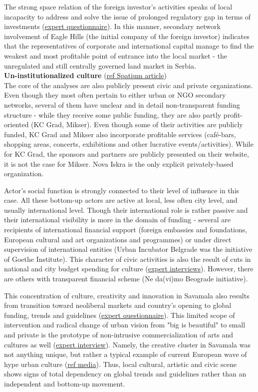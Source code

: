 \documentclass[11pt]{report}
\begin{document}
The strong space relation of the foreign investor's activities speaks of local incapacity to address and solve the issue of prolonged regulatory gap in terms of investments (\href{ref}{expert questionnaire}).
In this manner, secondary network involvement of Eagle Hills (the initial company of the foreign investor) indicates that the representatives of corporate and international capital manage to find the weakest and most profitable point of entrance into the local market - the unregulated and still centrally governed land market in Serbia.
\\

\textbf{Un-institutionalized culture} (\href{ref}{ref Spatium article})
\\
The core of the analyses are also publicly present civic and private organizations.
Even though they most often pertain to either urban or NGO secondary networks, several of them have unclear and in detail non-transparent funding structure - while they receive some public funding, they are also partly profit-oriented (KC Grad, Mikser).
Even though some of their activities are publicly funded, KC Grad and Mikser also incorporate profitable services (café-bars, shopping areas, concerts, exhibitions and other lucrative events/activities).
While for KC Grad, the sponsors and partners are publicly presented on their website, it is not the case for Mikser.
Nova Iskra is the only explicit privately-based organization.

Actor’s social function is strongly connected to their level of influence in this case.
All these bottom-up actors are active at local, less often city level, and usually international level. Though their international role is rather passive and their international visibility is more in the domain of funding - several are recipients of international financial support (foreign embassies and foundations, European cultural and art organizations and programmes) or under direct supervision of international entities (Urban Incubator Belgrade was the initiative of Goethe Institute).
This character of civic activities is also the result of cuts in national and city budget spending for culture (\href{ref}{expert interviews}).
However, there are others with transparent financial scheme (Ne da(vi)mo Beograde initiative). 

This concentration of culture, creativity and innovation in Savamala also results from transition toward neoliberal markets and country's opening to global funding, trends and guidelines (\href{ref}{expert questionnaire}).
This limited scope of intervention and radical change of urban vision from "big is beautiful" to small and private is the prototype of non-intrusive commercialization of arts and cultures as well (\href{ref}{expert interview}).
Namely, the creative cluster in Savamala was not anything unique, but rather a typical example of current European wave of hype urban culture (\href{ref}{ref media}).
Thus, local cultural, artistic and civic scene shows signs of total dependency on global trends and guidelines rather than an independent and bottom-up movement. 
\end{document}

